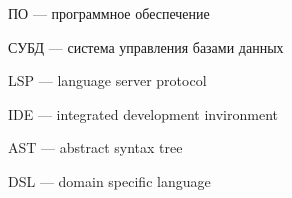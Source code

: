 
\hypertarget{ПО}{ПО --- программное обеспечение}

\hypertarget{СУБД}{СУБД --- система управления базами данных}

\hypertarget{LSP}{LSP --- language server protocol}

\hypertarget{IDE}{IDE --- integrated development invironment}

\hypertarget{AST}{AST --- abstract syntax tree}

\hypertarget{DSL}{DSL --- domain specific language}